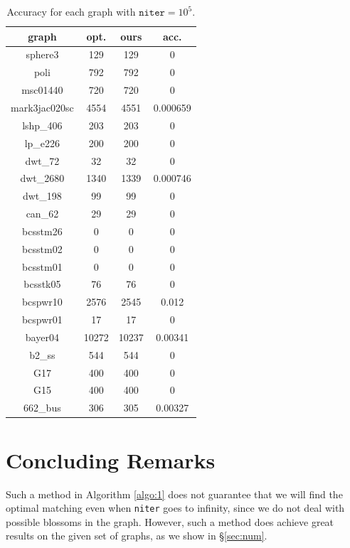 \documentclass{article}
\begin{document}
\begin{table}[htbp]
   \centering
   \begin{tabular}{|c|c|c|c|} %
   \hline
      graph    & opt. & ours & acc.  \\
      \hline
      sphere3      & 129 & 129 & 0 \\
               poli&792  &792 & 0 \\
               msc01440&720  &720 &0  \\
               mark3jac020sc& 4554 & 4551& 0.000659 \\
               lshp\_406&203  &203 &0  \\
               lp\_e226& 200 &200 &0  \\
               dwt\_72& 32 & 32& 0  \\
               dwt\_2680& 1340 &1339 &0.000746  \\
               dwt\_198&  99 & 99 & 0  \\
               can\_62 & 29 & 29 & 0  \\
               bcsstm26& 0   &  0 & 0 \\
               bcsstm02& 0 & 0& 0 \\
               bcsstm01& 0 & 0 & 0 \\
               bcsstk05& 76 & 76 & 0  \\
               bcspwr10 & 2576 & 2545 &  0.012\\
               bcspwr01 & 17  & 17 & 0 \\
               bayer04& 10272 & 10237 & 0.00341 \\
               b2\_ss& 544 &544 & 0 \\
               G17 & 400 & 400 & 0  \\
               G15 & 400 & 400& 0 \\
               662\_bus&  306 &305 &  0.00327 \\
       \hline
   \end{tabular}
   \caption{ Accuracy for each graph with $\texttt{niter}=10^5$.  }
   \label{tab:1}
\end{table}






\section{Concluding Remarks}
Such a method in Algorithm \ref{algo:1} does not guarantee that  we  will find  the optimal matching even when \texttt{niter} goes to infinity, since  we do not deal with possible blossoms in the graph.   However,  such a  method does achieve great  results  on the given set of graphs,  as  we show in \S\ref{sec:num}. 




\end{document}
